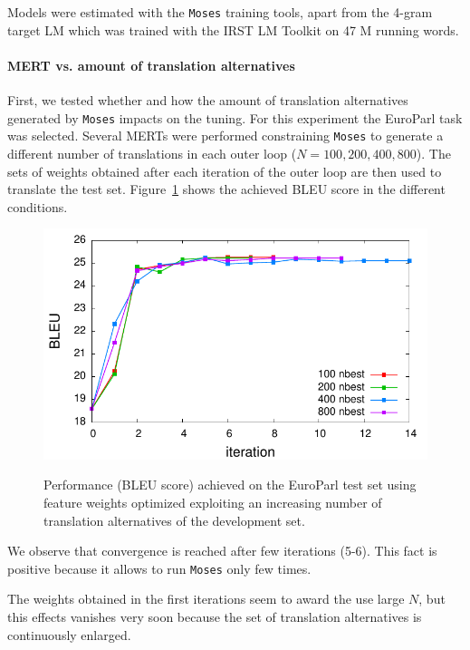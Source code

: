 \documentclass[10pt]{report}
\theoremstyle{plain}
\begin{document}
{Models were estimated with the {\tt Moses} training tools, apart from the 4-gram target LM which was trained with the IRST LM Toolkit on 47 M running words.


\paragraph{MERT vs. amount of translation alternatives}
First, we tested whether and how the amount of translation alternatives generated by {\tt Moses} impacts on the tuning. For this experiment the EuroParl task was selected. Several MERTs were performed constraining {\tt Moses} to generate a different number of translations in each outer loop ($N=100, 200, 400, 800$). The sets of weights obtained after each iteration of the outer loop are then used to translate the test set. Figure~\ref{fig:MERT-epps-nbest} shows the achieved BLEU score in the different conditions.

\begin{figure}[ht]
\begin{center}
\label{fig:MERT-epps-nbest}
 \includegraphics[width=\columnwidth]{MERT-nbest}
\caption{Performance (BLEU score) achieved on the EuroParl test set using feature weights optimized exploiting an increasing number of translation alternatives of the development set.}
\end{center}
 \end{figure}

We observe that convergence is reached after few iterations (5-6). This fact is positive because it allows to run {\tt Moses} only few times.

The weights obtained in the first iterations seem to award the use large $N$, but this effects vanishes very soon because the set of translation alternatives is continuously enlarged.

}
\end{document}
